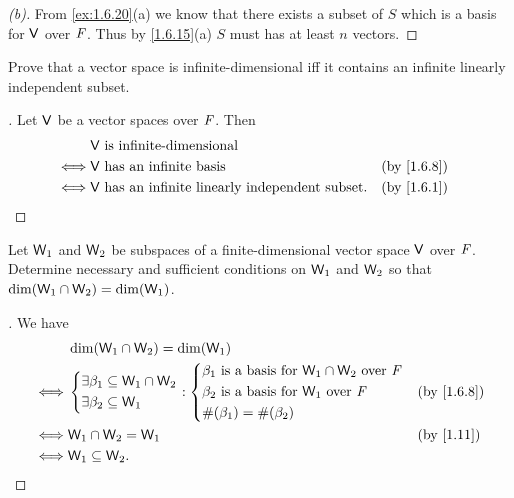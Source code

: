 \begin{proof}[(b)]
	From \cref{ex:1.6.20}(a) we know that there exists a subset of \(S\) which is a basis for \(\mathsf{V}\) over \(\mathit{F}\).
	Thus by \cref{1.6.15}(a) \(S\) must has at least \(n\) vectors.
\end{proof}

\begin{ex}\label{ex:1.6.21}
	Prove that a vector space is infinite-dimensional iff it contains an infinite linearly independent subset.
\end{ex}

\begin{proof}[]
	Let \(\mathsf{V}\) be a vector spaces over \(\mathit{F}\).
	Then
	\begin{align*}
		     & \V \text{ is infinite-dimensional}                                      \\
		\iff & \V \text{ has an infinite basis}                        &  & \by{1.6.8} \\
		\iff & \V \text{ has an infinite linearly independent subset}. &  & \by{1.6.1}
	\end{align*}
\end{proof}

\begin{ex}\label{ex:1.6.22}
	Let \(\mathsf{W}_1\) and \(\mathsf{W}_2\) be subspaces of a finite-dimensional vector space \(\mathsf{V}\) over \(\mathit{F}\).
	Determine necessary and sufficient conditions on \(\mathsf{W}_1\) and \(\mathsf{W}_2\) so that \(\dim(\mathsf{W}_1 \cap \mathsf{W}_2) = \dim(\mathsf{W}_1)\).
\end{ex}

\begin{proof}[]
	We have
	\begin{align*}
		     & \dim(\W_1 \cap \W_2) = \dim(\W_1)                                                 \\
		\iff & \begin{dcases}
			       \exists \beta_1 \subseteq \W_1 \cap \W_2 \\
			       \exists \beta_2 \subseteq \W_1
		       \end{dcases} : \begin{dcases}
			                      \beta_1 \text{ is a basis for } \W_1 \cap \W_2 \text{ over } \F \\
			                      \beta_2 \text{ is a basis for } \W_1 \text{ over } \F           \\
			                      \#(\beta_1) = \#(\beta_2)
		                      \end{dcases} &  & \by{1.6.8}    \\
		\iff & \W_1 \cap \W_2 = \W_1                                              &  & \by{1.11} \\
		\iff & \W_1 \subseteq \W_2.
	\end{align*}
\end{proof}

